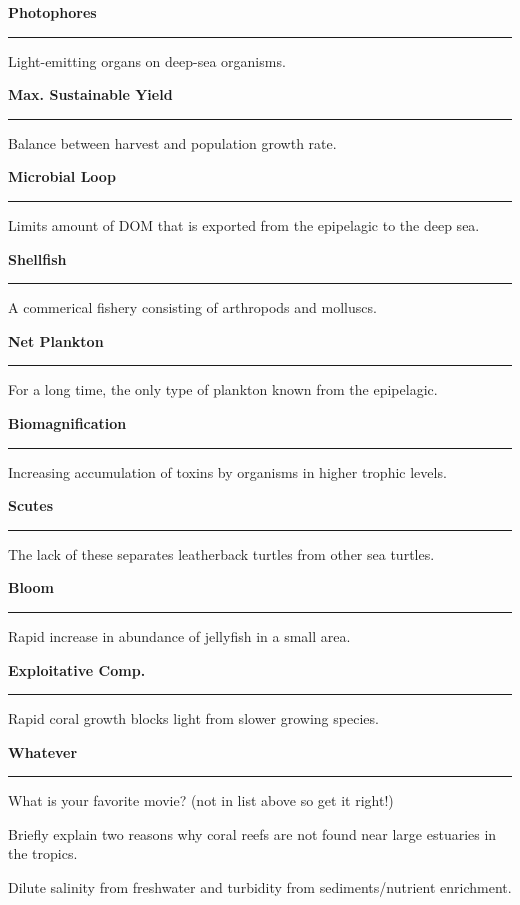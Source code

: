 \documentclass[11pt]{exam}
\newcommand*\Matching[1]{
\ifprintanswers
	\textbf{#1}
\else
	\rule{2.1in}{0.5pt}
\fi
}
\newlength\matchlena
\newlength\matchlenb
\newcommand\MatchQuestion[2]{%
	\setlength\matchlenb{\linewidth}
	\addtolength\matchlenb{-\matchlena}
	\parbox[t]{\matchlena}{\Matching{#1}}\enspace\parbox[t]{\matchlenb}{#2}}
\begin{document}
\begin{questions}

\vspace{-1\baselineskip}
\fullwidth{%

}
\vspace{0.7\baselineskip}

\question\MatchQuestion{Photophores}{Light-emitting organs on deep-sea organisms.}
\vspace{0.7\baselineskip}

\question\MatchQuestion{Max. Sustainable Yield}{Balance between harvest and population growth rate.}
\vspace{0.7\baselineskip}

\question\MatchQuestion{Microbial Loop}{Limits amount of DOM that is exported from the epipelagic to the deep sea.}
\vspace{0.7\baselineskip}

\question\MatchQuestion{Shellfish}{A commerical fishery consisting of arthropods and molluscs.}
\vspace{0.7\baselineskip}

\question\MatchQuestion{Net Plankton}{For a long time, the only type of plankton known from the epipelagic.}
\vspace{0.7\baselineskip}

\question\MatchQuestion{Biomagnification}{Increasing accumulation of toxins by organisms in higher trophic levels.}
\vspace{0.7\baselineskip}

\question\MatchQuestion{Scutes}{The lack of these separates leatherback turtles from other sea turtles.}
\vspace{0.7\baselineskip}

\question\MatchQuestion{Bloom}{Rapid increase in abundance of jellyfish in a small area.}
\vspace{0.7\baselineskip}

\question\MatchQuestion{Exploitative Comp.}{Rapid coral growth blocks light from slower growing species.}
\vspace{0.7\baselineskip}

\question\MatchQuestion{Whatever}{What is your favorite movie? (not in list above so get it right!)}
\vspace{0.7\baselineskip}

\newpage

\question[5]
Briefly explain two reasons why coral reefs are not found near large estuaries in the tropics.
	\begin{solution}
	Dilute salinity from freshwater and turbidity from sediments/nutrient enrichment.
	\end{solution}


\end{questions}
\end{document}
